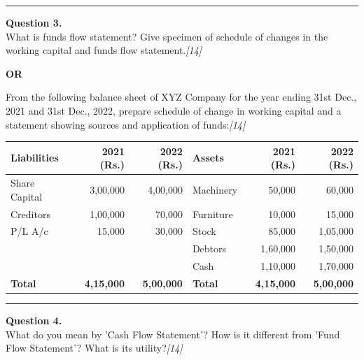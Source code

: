 \documentclass[11pt,a4paper]{article}
\newcommand{\pts}[1]{\hfill   \textit{[#1]}}
\begin{document}
\medskip\rule{\linewidth}{0.2pt}




\noindent   \textbf{Question 3.} \\
What is funds flow statement? Give specimen of schedule of changes in the working capital and funds flow statement.\pts{14}

\centerline{   \textbf{OR}}

From the following balance sheet of XYZ Company for the year ending 31st Dec., 2021 and 31st Dec., 2022, prepare schedule of change in working capital and a statement showing sources and application of funds:\pts{14}


\begin{center}
\renewcommand{\arraystretch}{1.2}
\small

\begin{tabular}{|l|r|r||l|r|r|}
\hline
   \textbf{Liabilities} &   \textbf{2021 (Rs.)} &   \textbf{2022 (Rs.)} &   \textbf{Assets} &   \textbf{2021 (Rs.)} &   \textbf{2022 (Rs.)} \\ \hline
Share Capital        & 3,00,000            & 4,00,000            & Machinery       & 50,000              & 60,000              \\
Creditors            & 1,00,000            & 70,000              & Furniture       & 10,000              & 15,000              \\
P/L A/c              & 15,000              & 30,000              & Stock           & 85,000              & 1,05,000            \\
                     &                     &                     & Debtors         & 1,60,000            & 1,50,000            \\
                     &                     &                     & Cash            & 1,10,000            & 1,70,000            \\ \hline
   \textbf{Total}       &   \textbf{4,15,000}   &   \textbf{5,00,000}   &   \textbf{Total}  &   \textbf{4,15,000}   &   \textbf{5,00,000}   \\ \hline
\end{tabular}
\end{center}

\medskip\rule{\linewidth}{0.2pt}




\noindent   \textbf{Question 4.} \\
What do you mean by 'Cash Flow Statement'? How is it different from 'Fund Flow Statement'? What is its utility?\pts{14}
\end{document}
